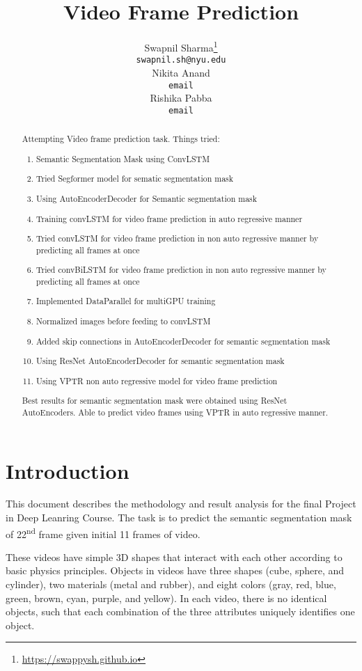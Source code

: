 \documentclass{article}
\title{Video Frame Prediction}
\author{%
  Swapnil Sharma\thanks{\url{https://swappysh.github.io}} \\
  \texttt{swapnil.sh@nyu.edu} \\
  \And
  Nikita Anand \\
  \texttt{email} \\
  \And
  Rishika Pabba \\
  \texttt{email} \\
}
\begin{document}
\maketitle


\begin{abstract}
  Attempting Video frame prediction task. Things tried:
  \begin{enumerate}
    \item Semantic Segmentation Mask using ConvLSTM
    \item Tried Segformer model for sematic segmentation mask
    \item Using AutoEncoderDecoder for Semantic segmentation mask
    \item Training convLSTM for video frame prediction in auto regressive
      manner
    \item Tried convLSTM for video frame prediction in non auto regressive
      manner by predicting all frames at once
    \item Tried convBiLSTM for video frame prediction in non auto regressive
      manner by predicting all frames at once
    \item Implemented DataParallel for multiGPU training
    \item Normalized images before feeding to convLSTM
    \item Added skip connections in AutoEncoderDecoder for semantic segmentation
      mask
    \item Using ResNet AutoEncoderDecoder for semantic segmentation mask
    \item Using VPTR non auto regressive model for video frame prediction
  \end{enumerate}

  Best results for semantic segmentation mask were obtained using ResNet AutoEncoders. 
  Able to predict video frames using VPTR in auto regressive manner.
\end{abstract}

\section{Introduction}
This document describes the methodology and result analysis for the final Project 
in Deep Leanring Course. The task is to predict the semantic segmentation mask of 
22\textsuperscript{nd} frame given initial 11 frames of video. 

These videos have simple 3D shapes that interact with each other according to basic 
physics principles. Objects in videos have three shapes (cube, sphere, and cylinder), 
two materials (metal and rubber), and eight colors (gray, red, blue, green, brown, cyan, 
purple, and yellow). In each video, there is no identical objects, such that each 
combination of the three attributes uniquely identifies one object.
\end{document}
